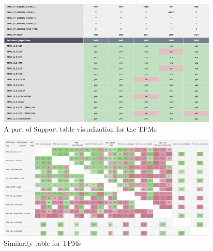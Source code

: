 \begin{landscape}
    \begin{figure}[!t]
        \includegraphics[width=\linewidth, height=\textwidth]{img/visualizations/tpm-support-data.png}
        \caption{A part of Support table visualization for the TPMs}
    \end{figure}
\end{landscape}

\begin{landscape}
    \begin{figure}[!t]
        \includegraphics[width=\linewidth, height=\textwidth]{img/visualizations/tpm-similarity.png}
        \caption{Similarity table for TPMs}
    \end{figure}
\end{landscape}

